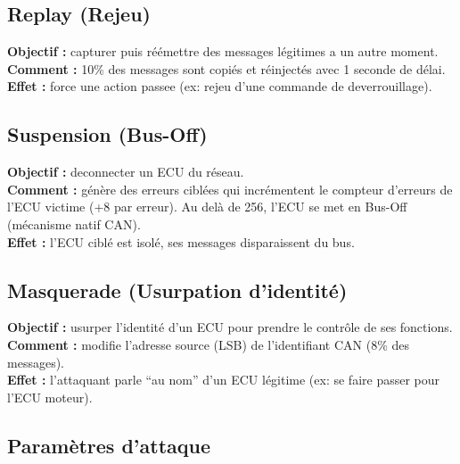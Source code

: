 \documentclass[12pt,a4paper]{article}
\begin{document}
\subsection{Replay (Rejeu)}

\begin{tcolorbox}[colback=red!5, colframe=red!50!black]
\textbf{Objectif :} capturer puis réémettre des messages légitimes a un autre moment.\\
\textbf{Comment :} 10\% des messages sont copiés et réinjectés avec 1 seconde de délai.\\
\textbf{Effet :} force une action passee (ex: rejeu d'une commande de deverrouillage).
\end{tcolorbox}

\subsection{Suspension (Bus-Off)}

\begin{tcolorbox}[colback=red!5, colframe=red!50!black]
\textbf{Objectif :} deconnecter un ECU du réseau.\\
\textbf{Comment :} génère des erreurs ciblées qui incrémentent le compteur d'erreurs de l'ECU victime (+8 par erreur). Au delà de 256, l'ECU se met en Bus-Off (mécanisme natif CAN).\\
\textbf{Effet :} l'ECU ciblé est isolé, ses messages disparaissent du bus.
\end{tcolorbox}

\subsection{Masquerade (Usurpation d'identité)}

\begin{tcolorbox}[colback=red!5, colframe=red!50!black]
\textbf{Objectif :} usurper l'identité d'un ECU pour prendre le contrôle de ses fonctions.\\
\textbf{Comment :} modifie l'adresse source (LSB) de l'identifiant CAN (8\% des messages).\\
\textbf{Effet :} l'attaquant parle ``au nom'' d'un ECU légitime (ex: se faire passer pour l'ECU moteur).
\end{tcolorbox}

\subsection{Paramètres d'attaque}
\end{document}
